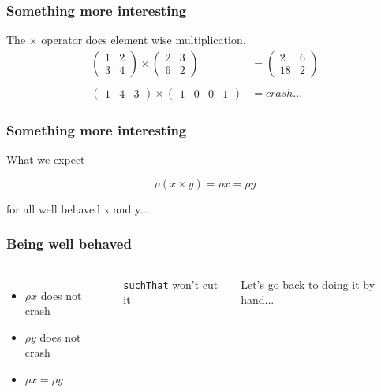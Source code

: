 \documentclass{beamer}
\begin{document}
\begin{frame}
    \frametitle{Something more interesting}
        The $\times$ operator does element wise multiplication.\\
        \begin{align*}
            \begin{pmatrix} 1 & 2\\3 & 4\end{pmatrix} \times \begin{pmatrix} 2 & 3\\6 & 2\end{pmatrix} &=
            \begin{pmatrix} 2 & 6\\18 & 2\end{pmatrix}\\\\
            \begin{pmatrix} 1 & 4 & 3 \end{pmatrix} \times \begin{pmatrix}1 & 0 & 0 & 1 \end{pmatrix} &= crash...
        \end{align*}
\end{frame}

\begin{frame}
    \frametitle{Something more interesting}
        \centerline{What we expect}
        \begin{equation*}
            \rho (x \times y) = \rho x = \rho y
        \end{equation*}
        \centerline{}
        \centerline{for all well behaved x and y...}
\end{frame}

\begin{frame}
    \frametitle{Being well behaved}
        \begin{columns}
                \begin{itemize}
                    \item $\rho x$ does not crash
                    \item $\rho y$ does not crash
                    \item $\rho x = \rho y$
                \end{itemize}
                \pause
                \centerline{\texttt{suchThat} won't cut it}
                \centerline{}
                \centerline{Let's go back to doing it by hand...}
        \end{columns}
\end{frame}
\end{document}
